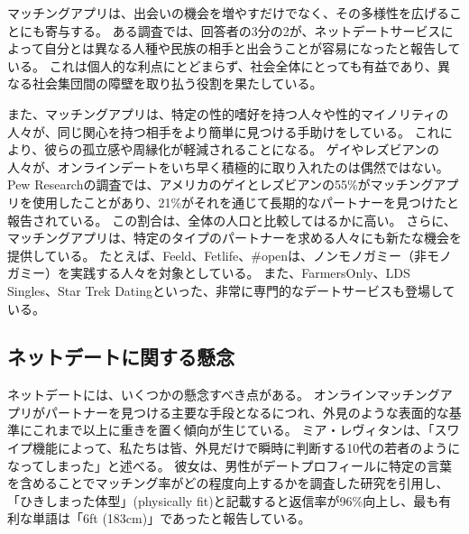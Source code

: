 \documentclass[paper=a4,book,openany]{jlreq}
\begin{document}
マッチングアプリは、出会いの機会を増やすだけでなく、その多様性を広げることにも寄与する。
ある調査では、回答者の3分の2が、ネットデートサービスによって自分とは異なる人種や民族の相手と出会うことが容易になったと報告している\citep{hergovich17:_stren_absen_ties}。
これは個人的な利点にとどまらず、社会全体にとっても有益であり、異なる社会集団間の障壁を取り払う役割を果たしている。

また、マッチングアプリは、特定の性的嗜好を持つ人々や性的マイノリティの人々が、同じ関心を持つ相手をより簡単に見つける手助けをしている。
これにより、彼らの孤立感や周縁化が軽減されることになる。
ゲイやレズビアンの人々が、オンラインデートをいち早く積極的に取り入れたのは偶然ではない。
Pew Researchの調査では、アメリカのゲイとレズビアンの55\%がマッチングアプリを使用したことがあり、21\%がそれを通じて長期的なパートナーを見つけたと報告されている。
この割合は、全体の人口と比較してはるかに高い。
さらに、マッチングアプリは、特定のタイプのパートナーを求める人々にも新たな機会を提供している。
たとえば、Feeld、Fetlife、\#openは、ノンモノガミー（非モノガミー）を実践する人々を対象としている。
また、FarmersOnly、LDS Singles、Star Trek Datingといった、非常に専門的なデートサービスも登場している。

\subsection{ネットデートに関する懸念}

ネットデートには、いくつかの懸念すべき点がある。
オンラインマッチングアプリがパートナーを見つける主要な手段となるにつれ、外見のような表面的な基準にこれまで以上に重きを置く傾向が生じている。
ミア・レヴィタンは、「スワイプ機能によって、私たちは皆、外見だけで瞬時に判断する10代の若者のようになってしまった」と述べる。
彼女は、男性がデートプロフィールに特定の言葉を含めることでマッチング率がどの程度向上するかを調査した研究を引用し、「ひきしまった体型」(physically fit)と記載すると返信率が96\%向上し、最も有利な単語は「6ft (183cm)」であったと報告している\citep{levitan20:_futur_seduc_lond,dodgson18:_usin_thes_word}。
\end{document}
